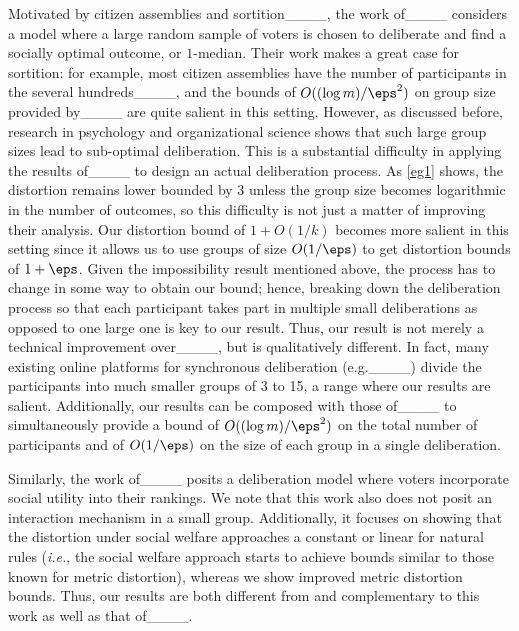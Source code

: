 Motivated by citizen assemblies and sortition____, the work of____ considers a model where a large random sample of voters is chosen to deliberate and find a socially optimal outcome, or $1$-median. %
Their work makes a great case for sortition: for example, most citizen assemblies have the number of participants in the several hundreds____, and the bounds of $O((\log m)/\eps^2)$ on group size provided by____ are quite salient in this setting. However, as discussed before, research in psychology and organizational science shows that such large group sizes lead to sub-optimal deliberation. This is a substantial difficulty in applying the results of____ to design an actual deliberation process. As \cref{eg1} shows, the distortion remains lower bounded by $3$ unless the group size becomes logarithmic in the number of outcomes, so this difficulty is not just a matter of improving their analysis. Our distortion bound of $1 + O(1/k)$ becomes more salient in this setting since it allows us to use groups of size $O(1/\eps)$ to get distortion bounds of $1+\eps$. Given the impossibility result mentioned above, the process has to change in some way to obtain our bound; hence, breaking down the deliberation process so that each participant takes part in multiple small deliberations as opposed to one large one is key to our result. Thus, our result is not merely a technical improvement over____, but is qualitatively different. In fact, many existing online platforms for synchronous deliberation (e.g.____) divide the participants into much smaller groups of 3 to 15, a range where our results are salient. Additionally, our results can be composed with those of____ to simultaneously provide a bound of $O((\log m)/\eps^2)$ on the total number of participants and of $O(1/\eps)$ on the size of each group in a single deliberation. 

Similarly, the work of____ posits a deliberation model where voters incorporate social utility into their rankings. We note that this work also does not posit an interaction mechanism in a small group. Additionally, it focuses on showing that the distortion under social welfare approaches a constant or linear for natural rules ({\em i.e.}, the social welfare approach starts to achieve bounds similar to those known for metric distortion), whereas we show improved metric distortion bounds. Thus, our results are both different from and complementary to this work as well as that of____.

